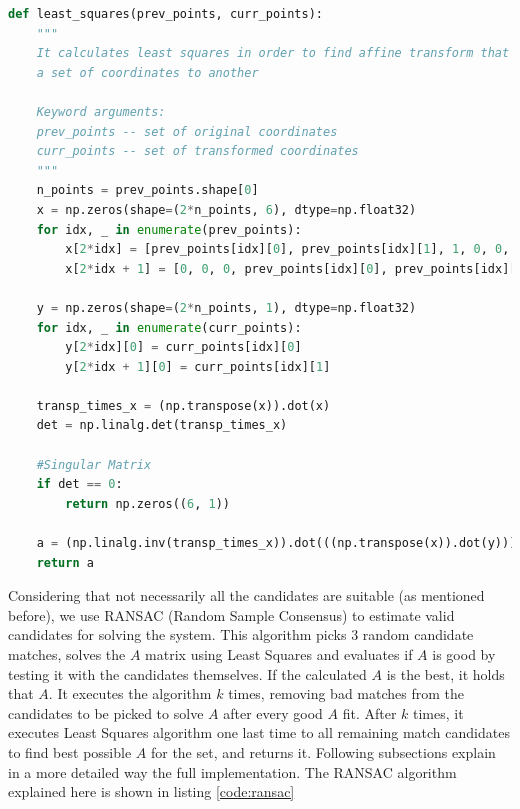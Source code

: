 \documentclass[]{IEEEtran}
\begin{document}
 \begin{lstlisting}[language=Python, caption={Least Squares Implementation}, label={code:least-squares}]
  def least_squares(prev_points, curr_points):
    """
    It calculates least squares in order to find affine transform that transforms
    a set of coordinates to another

    Keyword arguments:
    prev_points -- set of original coordinates
    curr_points -- set of transformed coordinates
    """
    n_points = prev_points.shape[0]
    x = np.zeros(shape=(2*n_points, 6), dtype=np.float32)
    for idx, _ in enumerate(prev_points):
        x[2*idx] = [prev_points[idx][0], prev_points[idx][1], 1, 0, 0, 0]
        x[2*idx + 1] = [0, 0, 0, prev_points[idx][0], prev_points[idx][1], 1]

    y = np.zeros(shape=(2*n_points, 1), dtype=np.float32)
    for idx, _ in enumerate(curr_points):
        y[2*idx][0] = curr_points[idx][0]
        y[2*idx + 1][0] = curr_points[idx][1]

    transp_times_x = (np.transpose(x)).dot(x)
    det = np.linalg.det(transp_times_x)

    #Singular Matrix
    if det == 0:
        return np.zeros((6, 1))

    a = (np.linalg.inv(transp_times_x)).dot(((np.transpose(x)).dot(y)))
    return a
\end{lstlisting}

Considering that not necessarily all the candidates are suitable (as mentioned before), we use RANSAC (Random Sample Consensus) to estimate valid candidates for solving the system. This algorithm picks 3 random candidate matches, solves the $A$ matrix using Least Squares and evaluates if $A$ is good by testing it with the candidates themselves. If the calculated $A$ is the best, it holds that $A$. It executes the algorithm $k$ times, removing bad matches from the candidates to be picked to solve $A$ after every good $A$ fit. After $k$ times, it executes Least Squares algorithm one last time to all remaining match candidates to find best possible $A$ for the set, and returns it. Following subsections explain in a more detailed way the full implementation. The RANSAC algorithm explained here is shown in listing \ref{code:ransac}
\end{document}
